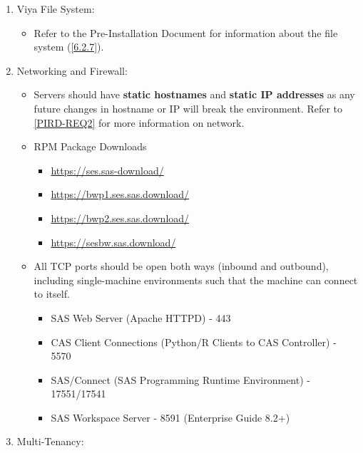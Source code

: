 \begin{enumerate}
    \item Viya File System:
    \begin{itemize}
        \item Refer to the Pre-Installation Document for information about the file system (\ref{6.2.7}). 
    \end{itemize}
    \item Networking and Firewall:
    \begin{itemize}
        \item Servers should have \textbf{static hostnames} and \textbf{static IP addresses} as any future changes in hostname or IP will break the environment. Refer to \ref{PIRD-REQ2} for more information on network.
        \item RPM Package Downloads
        \begin{itemize}
            \item \href{https://ses.sas-download/}{https://ses.sas-download/}
            \item \href{https://bwp1.ses.sas.download/}{https://bwp1.ses.sas.download/}
            \item \href{https://bwp2.ses.sas.download/}{https://bwp2.ses.sas.download/}
            \item \href{https://sesbw.sas.download/}{https://sesbw.sas.download/}
        \end{itemize}
        \item All TCP ports should be open both ways (inbound and outbound), including single-machine environments such that the machine can connect to itself. 
        \begin{itemize}
            \item SAS Web Server (Apache HTTPD) - 443
            \item CAS Client Connections (Python/R Clients to CAS Controller) - 5570
            \item SAS/Connect (SAS Programming Runtime Environment) - 17551/17541
            \item SAS Workspace Server - 8591 (Enterprise Guide 8.2+)
        \end{itemize}
    \end{itemize}
    \item Multi-Tenancy:
    \begin{itemize}

\end{itemize}
\end{enumerate}
